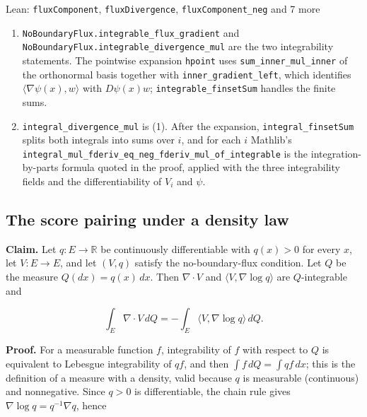 \documentclass[11pt,a4paper]{report}
\begin{document}
\begin{leanbox}{Lean: \texttt{fluxComponent}, \texttt{fluxDivergence}, \texttt{fluxComponent\_\allowbreak{}neg} and 7 more}
\begin{enumerate}
\item \texttt{No\allowbreak{}Boundary\allowbreak{}Flux.\allowbreak{}integrable\_\allowbreak{}flux\_\allowbreak{}gradient} and \texttt{No\allowbreak{}Boundary\allowbreak{}Flux.\allowbreak{}integrable\_\allowbreak{}divergence\_\allowbreak{}mul} are the two integrability statements. The pointwise expansion \texttt{hpoint} uses \texttt{sum\_\allowbreak{}inner\_\allowbreak{}mul\_\allowbreak{}inner} of the orthonormal basis together with \texttt{inner\_\allowbreak{}gradient\_\allowbreak{}left}, which identifies \(\langle\nabla\psi(x),w\rangle\) with \(D\psi(x)w\); \texttt{integrable\_\allowbreak{}finset\allowbreak{}Sum} handles the finite sums.

\item \texttt{integral\_\allowbreak{}divergence\_\allowbreak{}mul} is (1). After the expansion, \texttt{integral\_\allowbreak{}finset\allowbreak{}Sum} splits both integrals into sums over \(i\), and for each \(i\) Mathlib's \texttt{integral\_\allowbreak{}mul\_\allowbreak{}fderiv\_\allowbreak{}eq\_\allowbreak{}neg\_\allowbreak{}fderiv\_\allowbreak{}mul\_\allowbreak{}of\_\allowbreak{}integrable} is the integration-by-parts formula quoted in the proof, applied with the three integrability fields and the differentiability of \(V_i\) and \(\psi\).

\end{enumerate}
\end{leanbox}
\subsection{\texorpdfstring{The score pairing under a density law}{The score pairing under a density law}}


\textbf{Claim.} Let \(q:E\to\mathbb R\) be continuously differentiable with \(q(x)>0\) for every \(x\), let \(V:E\to E\), and let \((V,q)\) satisfy the no-boundary-flux condition. Let \(Q\) be the measure \(Q(dx)=q(x)\,dx\). Then \(\nabla\cdot V\) and \(\langle V,\nabla\log q\rangle\) are \(Q\)-integrable and


\[\int_E\nabla\cdot V\,dQ=-\int_E\langle V,\nabla\log q\rangle\,dQ.\]


\textbf{Proof.} For a measurable function \(f\), integrability of \(f\) with respect to \(Q\) is equivalent to Lebesgue integrability of \(qf\), and then \(\int f\,dQ=\int qf\,dx\); this is the definition of a measure with a density, valid because \(q\) is measurable (continuous) and nonnegative. Since \(q>0\) is differentiable, the chain rule gives \(\nabla\log q=q^{-1}\nabla q\), hence
\end{document}
